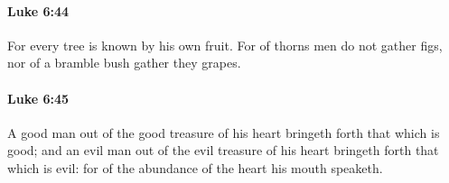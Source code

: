 		\paragraph{Luke 6:44} %
			\label{LUKE-6-44}

			For every tree is known by his own fruit. For of thorns men do not gather figs, nor of a bramble bush gather they grapes.

			\begin{framed}
			\scriptsize
				\begin{compactdesc}
					\item[SBLG] 
				\end{compactdesc}
			\end{framed}

		\paragraph{Luke 6:45} %
			\label{LUKE-6-45}

			A good man out of the good treasure of his heart bringeth forth that which is good; and an evil man out of the evil treasure of his heart bringeth forth that which is evil: for of the abundance of the heart his mouth speaketh.


